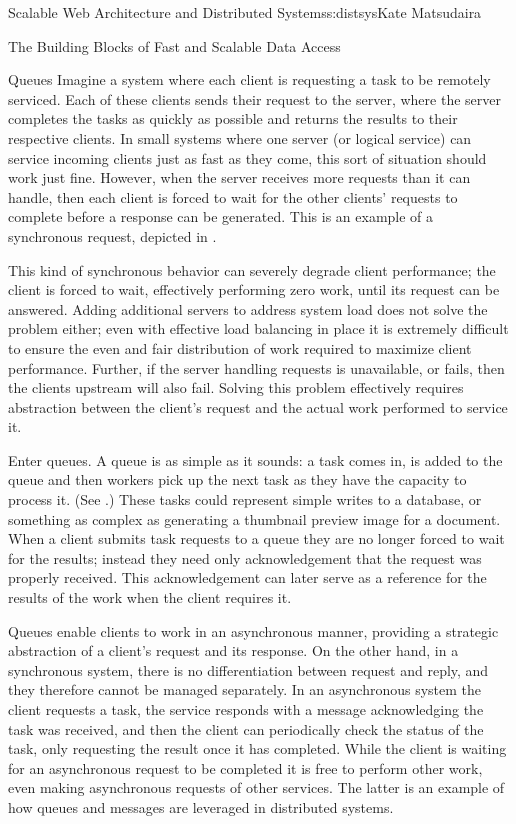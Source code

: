 \begin{aosachapter}{Scalable Web Architecture and Distributed Systems}{s:distsys}{Kate Matsudaira}
\begin{aosasect1}{The Building Blocks of Fast and Scalable Data Access}
\begin{aosasect2}{Queues}
Imagine a system where each client is requesting a task to be remotely
serviced. Each of these clients sends their request to the server,
where the server completes the tasks as quickly as possible and
returns the results to their respective clients. In small systems
where one server (or logical service) can service incoming clients
just as fast as they come, this sort of situation should work just
fine. However, when the server receives more requests than it can
handle, then each client is forced to wait for the other clients'
requests to complete before a response can be generated. This is an
example of a synchronous request, depicted in .

This kind of synchronous behavior can severely degrade client
performance; the client is forced to wait, effectively performing zero
work, until its request can be answered. Adding additional servers to
address system load does not solve the problem either; even with
effective load balancing in place it is extremely difficult to ensure
the even and fair distribution of work required to maximize client
performance. Further, if the server handling requests is unavailable,
or fails, then the clients upstream will also fail. Solving this
problem effectively requires abstraction between the client's request
and the actual work performed to service it.


Enter queues. A queue is as simple as it sounds: a task comes in, is
added to the queue and then workers pick up the next task as they have
the capacity to process it. (See .) These tasks 
could represent simple writes to a
database, or something as complex as generating a thumbnail preview
image for a document. When a client submits task requests to a queue
they are no longer forced to wait for the results; instead they need
only acknowledgement that the request was properly received. This
acknowledgement can later serve as a reference for the results of the
work when the client requires it.

Queues enable clients to work in an asynchronous manner, providing a
strategic abstraction of a client's request and its response. On the
other hand, in a synchronous system, there is no differentiation
between request and reply, and they therefore cannot be managed
separately. In an asynchronous system the client requests a task, the
service responds with a message acknowledging the task was received,
and then the client can periodically check the status of the task,
only requesting the result once it has completed. While the client is
waiting for an asynchronous request to be completed it is free to
perform other work, even making asynchronous requests of other
services. The latter is an example of how queues and messages are
leveraged in distributed systems.


\end{aosasect2}
\end{aosasect1}
\end{aosachapter}
